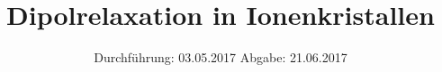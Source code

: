 

\subject{V48}
\title{Dipolrelaxation in Ionenkristallen}
\date{
  Durchführung: 03.05.2017
  \hspace{3em}
  Abgabe: 21.06.2017
}



\maketitle
\thispagestyle{empty}
\tableofcontents
\newpage







\printbibliography



